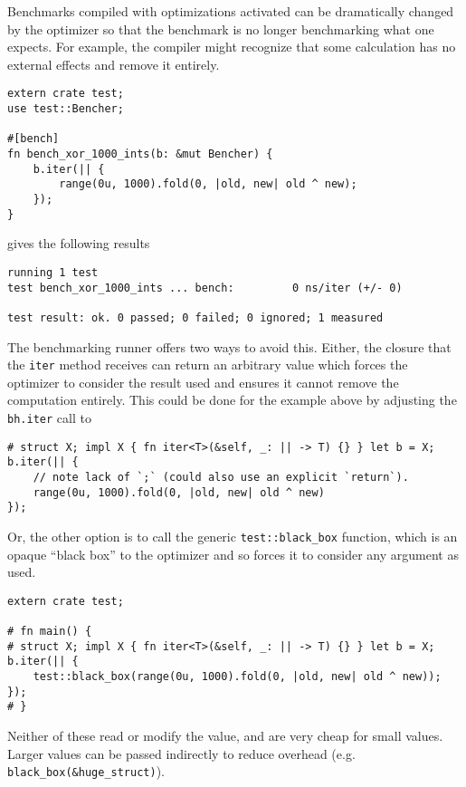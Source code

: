 \documentclass[]{article}
\begin{document}
Benchmarks compiled with optimizations activated can be dramatically
changed by the optimizer so that the benchmark is no longer benchmarking
what one expects. For example, the compiler might recognize that some
calculation has no external effects and remove it entirely.

\begin{verbatim}
extern crate test;
use test::Bencher;

#[bench]
fn bench_xor_1000_ints(b: &mut Bencher) {
    b.iter(|| {
        range(0u, 1000).fold(0, |old, new| old ^ new);
    });
}
\end{verbatim}

gives the following results

\begin{verbatim}
running 1 test
test bench_xor_1000_ints ... bench:         0 ns/iter (+/- 0)

test result: ok. 0 passed; 0 failed; 0 ignored; 1 measured
\end{verbatim}

The benchmarking runner offers two ways to avoid this. Either, the
closure that the \texttt{iter} method receives can return an arbitrary
value which forces the optimizer to consider the result used and ensures
it cannot remove the computation entirely. This could be done for the
example above by adjusting the \texttt{bh.iter} call to

\begin{verbatim}
# struct X; impl X { fn iter<T>(&self, _: || -> T) {} } let b = X;
b.iter(|| {
    // note lack of `;` (could also use an explicit `return`).
    range(0u, 1000).fold(0, |old, new| old ^ new)
});
\end{verbatim}

Or, the other option is to call the generic \texttt{test::black\_box}
function, which is an opaque ``black box'' to the optimizer and so
forces it to consider any argument as used.

\begin{verbatim}
extern crate test;

# fn main() {
# struct X; impl X { fn iter<T>(&self, _: || -> T) {} } let b = X;
b.iter(|| {
    test::black_box(range(0u, 1000).fold(0, |old, new| old ^ new));
});
# }
\end{verbatim}

Neither of these read or modify the value, and are very cheap for small
values. Larger values can be passed indirectly to reduce overhead (e.g.
\texttt{black\_box(\&huge\_struct)}).
\end{document}
